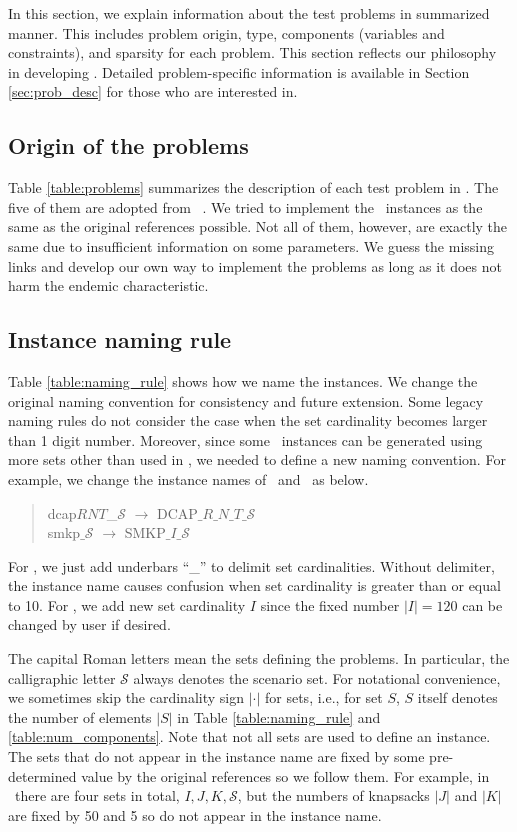 In this section, we explain information about the test problems in summarized manner. This includes problem origin, type, components (variables and constraints), and sparsity for each problem. This section reflects our philosophy in developing \siplibtwo. Detailed problem-specific information is available in Section \ref{sec:prob_desc} for those who are interested in.

\subsection{Origin of the problems}
Table \ref{table:problems} summarizes the description of each test problem in \siplibtwo. The five of them are adopted from \siplib\ \cite{web:SIPLIB1}. We tried to implement the \siplib\ instances as the same as the original references possible. Not all of them, however, are exactly the same due to insufficient information on some parameters. We guess the missing links and develop our own way to implement the problems as long as it does not harm the endemic characteristic. 


\subsection{Instance naming rule}
Table \ref{table:naming_rule} shows how we name the instances. We change the original naming convention for consistency and future extension. Some legacy naming rules do not consider the case when the set cardinality becomes larger than 1 digit number. Moreover, since some \siplibtwo\ instances can be generated using more sets other than used in \siplib, we needed to define a new naming convention. For example, we change the instance names of \dcap\ and \smkp\ as below.
\begin{quote}
	\centering dcap$RNT$\_$\mathcal{S}$ $\longrightarrow$ DCAP$\_R\_N\_T\_\mathcal{S}$\\
	smkp$\_\mathcal{S}$ $\longrightarrow$ SMKP$\_I\_\mathcal{S}$
\end{quote}
For \dcap, we just add underbars ``\_'' to delimit set cardinalities. Without delimiter, the instance name causes confusion when set cardinality is greater than or equal to 10. For \smkp, we add new set cardinality $I$ since the fixed number $|I|=120$ can be changed by user if desired.

The capital Roman letters mean the sets defining the problems. In particular, the calligraphic letter $\mathcal{S}$ always denotes the scenario set. For notational convenience, we sometimes skip the cardinality sign $|\cdot|$ for sets, i.e., for set $S$, $S$ itself denotes the number of elements $|S|$ in Table \ref{table:naming_rule} and \ref{table:num_components}. Note that not all sets are used to define an instance. The sets that do not appear in the instance name are fixed by some pre-determined value by the original references so we follow them. For example, in \smkp\ there are four sets in total, $I,J,K,\mathcal{S}$, but the numbers of knapsacks $|J|$ and $|K|$ are fixed by 50 and 5 so do not appear in the instance name.


